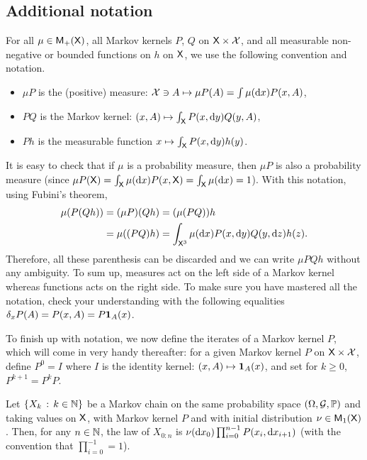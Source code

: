 \documentclass[english,graybox,envcountchap,envcountsame,sectrefs,shortlabels]{svmono}
\theoremstyle{style}
\begin{document}
\subsection{Additional notation}
For all $\mu\in\mathsf{M}_{+}(\mathsf{X})$, all Markov kernels $P$, $Q$ on
$\mathsf{X}\times\mathcal{X}$, and all measurable non-negative or bounded
functions on $h$ on $\mathsf{X}$, we use the following convention and
notation.
\begin{itemize}
\item $\mu P$ is the (positive) measure: $\mathcal{X}\ni A\mapsto\mu P(A)=\int\mu(\mathrm{d} x)P(x,A)$,
\item $PQ$ is the Markov kernel: $(x,A)\mapsto\int_{\mathsf{X}}P(x,\mathrm{d} y)Q(y,A)$,
\item $Ph$ is the measurable function $x\mapsto\int_{\mathsf{X}}P(x,\mathrm{d} y)h(y)$.
\end{itemize}
It is easy to check that if $\mu$ is a probability measure, then
$\mu P$ is also a probability measure (since $\mu P(\mathsf{X})=\int_{\mathsf{X}}\mu(\mathrm{d} x)P(x,\mathsf{X})=\int_{\mathsf{X}}\mu(\mathrm{d} x)=1$).
With this notation, using Fubini's theorem,
\begin{align*}
\mu(P(Qh)) & =(\mu P)(Qh)=(\mu(PQ))h\\
 & =\mu((PQ)h)=\int_{\mathsf{X}^{3}}\mu(\mathrm{d} x)P(x,\mathrm{d} y)Q(y,\mathrm{d} z)h(z).
\end{align*}
Therefore, all these parenthesis can be discarded and we can write
$\mu PQh$ without any ambiguity. 
To sum up, measures act on the left side of a Markov kernel whereas
functions acts on the right side. To make sure you have mastered all
the notation, check your understanding with the following equalities
$\delta_{x}P(A)=P(x,A)=P\mathbf{1}_{A}(x)$.

To finish up with notation, we now define the iterates of a Markov
kernel $P$, which will come in very handy thereafter: for a given
Markov kernel $P$ on $\mathsf{X}\times\mathcal{X}$, define $P^{0}=I$ where
$I$ is the identity kernel: $(x,A)\mapsto\mathbf{1}_{A}(x)$, and set for
$k\geq0$, $P^{k+1}=P^{k}P$.


\begin{lemma}
Let $\left\{ X_{k}\,:\,k\in\mathbb{N}\right\}$ be a Markov chain on the same probability
space $(\Omega,\mathcal{G},\mathbb{P})$ and taking values on $\mathsf{X}$, with Markov
kernel $P$ and with initial distribution $\nu\in\mathsf{M}_{1}(\mathsf{X})$.
Then, for any $n\in\mathbb{N}$, the law of $X_{0:n}$ is $\nu(\mathrm{d} x_{0})\prod_{i=0}^{n-1}P(x_{i},\mathrm{d} x_{i+1})$
(with the convention that $\prod_{i=0}^{-1}=1$).
\end{lemma}
\end{document}
